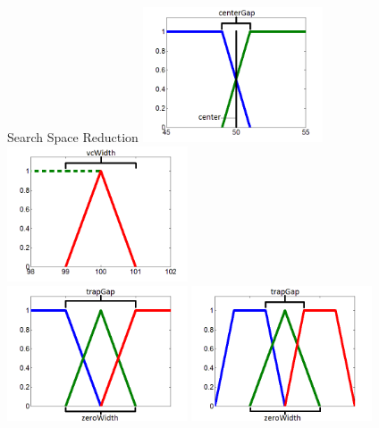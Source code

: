 \documentclass[]{beamer}
\begin{document}
\begin{frame}{Search Space Reduction}
            \centering
            \vspace{2em}
            \includegraphics[width=0.4\textwidth]{media/image21}
            \includegraphics[width=0.4\textwidth]{media/image22}\\
            \includegraphics[width=0.4\textwidth]{media/image23}
            \includegraphics[width=0.4\textwidth]{media/image24}
\end{frame}
\end{document}
